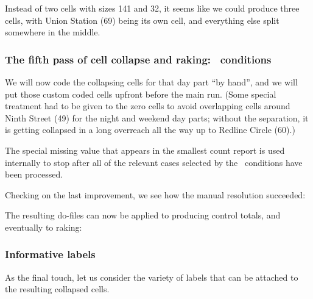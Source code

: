 Instead of two cells with sizes 141 and 32, it seems like we could produce three cells, with
Union Station (69) being its own cell, and everything else split somewhere in the middle.

\subsubsection{The fifth pass of cell collapse and raking: \ifexp\ conditions}

We will now code the collapsing cells for that day part ``by hand'', and we will put those
custom coded cells upfront before the main run. (Some special treatment had to be given
to the zero cells to avoid overlapping cells around Ninth Street (49) for the night and weekend
day parts; without the separation, it is getting collapsed in a long overreach all the way up to
Redline Circle (60).)

\begin{stlog}
\nullskip
\end{stlog}

The special missing value  that appears in the smallest count report is
used internally to stop  after all of the relevant cases
selected by the \ifexp\ conditions have been processed.

Checking on the last improvement, we see how the manual resolution succeeded:

\begin{stlog}
\nullskip
\end{stlog}

The resulting do-files can now be applied to producing control totals, and eventually to raking:

\begin{stlog}
\nullskip
\end{stlog}

\subsubsection{Informative labels}
\label{subsec:wgtcellcollapse:labels}

As the final touch, let us consider the variety of labels that can be attached to the resulting
collapsed cells.

\begin{stlog}
\nullskip
\end{stlog}


